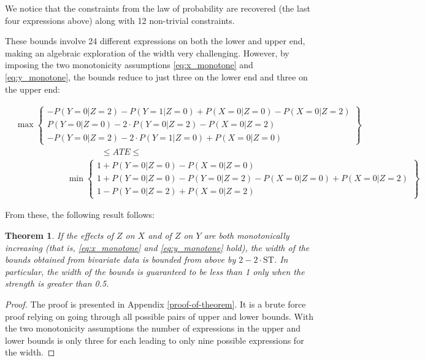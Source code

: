 \documentclass[
]{article}
\theoremstyle{plain}
\newtheorem{theorem}{Theorem}[section]
\begin{document}
We notice that the constraints from the law of probability are recovered (the last four expressions above) along with 12 non-trivial constraints.

These bounds involve 24 different expressions on both the lower and upper end, making an algebraic exploration of the width very challenging. However, by imposing the two monotonicity assumptions \eqref{eq:x_monotone} and \eqref{eq:y_monotone}, the bounds reduce to just three on the lower end and three on the upper end:

\[
\begin{aligned}
    &\max
      \begin{Bmatrix}
        -P(Y = 0 | Z = 2) - P(Y = 1 | Z = 0) + P(X = 0 | Z = 0) - P(X = 0 | Z = 2) \\
        P(Y = 0 | Z = 0) - 2\cdot P(Y = 0 | Z = 2) - P(X = 0 | Z = 2) \\
        -P(Y = 0 | Z = 2) - 2\cdot P(Y = 1 | Z = 0) + P(X = 0 | Z = 0)
      \end{Bmatrix} \\
    &\qquad \qquad \qquad \qquad \qquad\le ATE \le \\
    &\qquad \qquad \qquad \min
      \begin{Bmatrix}
        1 + P(Y = 0 | Z = 0) - P(X = 0 | Z = 0) \\
        1 + P(Y = 0 | Z = 0) - P(Y = 0 | Z = 2) - P(X = 0 | Z = 0) + P(X = 0 | Z = 2) \\
        1 - P(Y = 0 | Z = 2) +  P(X = 0 | Z = 2)
      \end{Bmatrix}
\end{aligned}
\]

From these, the following result follows:

\begin{theorem}\label{thm:upperBoundWidth}
If the effects of $Z$ on $X$ and of $Z$ on $Y$ are both monotonically increasing (that is, \eqref{eq:x_monotone} and \eqref{eq:y_monotone} hold), the width of the bounds obtained from bivariate data is bounded from above by $2 - 2\cdot \text{ST}$. In particular, the width of the bounds is guaranteed to be less than 1 only when the strength is greater than 0.5.
\end{theorem}

\begin{proof}
The proof is presented in Appendix \ref{proof-of-theorem}. It is a brute force proof relying on going through all possible pairs of upper and lower bounds. With the two monotonicity assumptions the number of expressions in the upper and lower bounds is only three for each leading to only nine possible expressions for the width. 
\end{proof}
\end{document}
